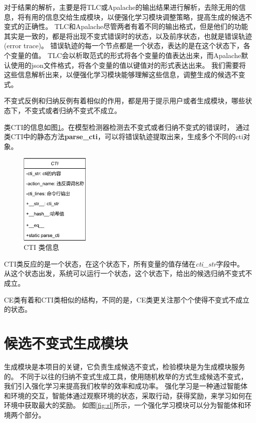 对于结果的解析，主要是将TLC或Apalache的输出结果进行解析，去除无用的信息，将有用的信息交给生成模块，以便强化学习模块调整策略，提高生成的候选不变式的正确性。
TLC和Apalache尽管两者有着不同的输出格式，但是他们的功能其实是一致的，都是将出现不变式错误时的状态，以及前序状态，也就是错误轨迹(error trace)。
错误轨迹的每一个节点都是一个状态，表达的是在这个状态下，各个变量的值。
TLC会以析取范式的形式将各个变量的值表达出来，而Apalache默认使用的json文件格式，将各个变量的值以键值对的形式表达出来。
我们需要将这些信息解析出来，以便强化学习模块能够理解这些信息，调整生成的候选不变式。

不变式反例和归纳反例有着相似的作用，都是用于提示用户或者生成模块，哪些状态下，不变式或者归纳不变式不成立。

类CTI的信息如图\ref{fig:class_cti}。在模型检测器检测去不变式或者归纳不变式的错误时，
通过类CTI中的静态方法\textbf{parse\_cti}，可以将错误轨迹提取出来，生成多个不同的cti对象。
\begin{figure}[h]
    \centering
    \includegraphics[width=0.3\textwidth]{figures/class_cti.pdf}
    \caption{CTI 类信息}
    \label{fig:class_cti}
\end{figure}
CTI类反应的是一个状态，在这个状态下，所有变量的值存储在\textit{cti\_str}字段中。
从这个状态出发，系统可以运行一个状态，这个状态下，给出的候选归纳不变式不成立。

CE类有着和CTI类相似的结构，不同的是，CE类更关注那个个使得不变式不成立的状态。


\section{候选不变式生成模块}

生成模块是本项目的关键，它负责生成候选不变式，检验模块是为生成模块服务的。
不同于以往的归纳不变式生成工具，使用随机枚举的方式生成候选不变式，我们引入强化学习来提高我们枚举的效率和成功率。
强化学习是一种通过智能体和环境的交互，智能体通过观察环境的状态，采取行动，获得奖励，来学习如何在环境中获取最大的奖励。
如图\ref{fig:rl}所示，一个强化学习模块可以分为智能体和环境两个部分。

